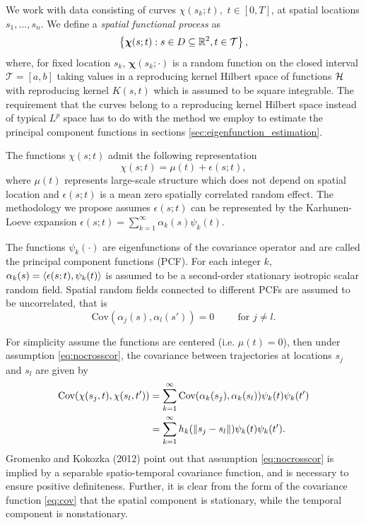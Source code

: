 We work with data consisting of curves $\chi(s_k; t),$ $t \in [0,T]$, at spatial locations $s_1, \dots, s_n$. We define a \emph{spatial functional process} as 
	\[
	 \left\{ \boldsymbol\chi(s; t): s \in D  \subseteq  \mathbb{R} ^2, t \in \mathcal{T} \right\},
	 \] 
where, for fixed location $s_k$, $\boldsymbol\chi(s_k; \cdot)$ is a random function on the closed interval $\mathcal{T} = [a,b]$ taking values in a reproducing kernel Hilbert space of functions $\mathcal{H}$ with reproducing kernel $K(s,t)$ which is assumed to be square integrable. The requirement that the curves belong to a reproducing kernel Hilbert space instead of typical $L^p$ space has to do with the method we employ to estimate the principal component functions in sections \ref{sec:eigenfunction_estimation}.
	
The functions $\chi(s;t)$ admit the following representation 
\begin{equation}
 	\chi(s;t) = \mu(t) + \epsilon(s;t),
\end{equation}
where $\mu(t)$ represents large-scale structure which does not depend on spatial location and $\epsilon(s;t)$ is a mean zero spatially correlated random effect. The methodology we propose assumes $\epsilon(s;t)$ can be represented by the Karhunen-Loeve expansion $\epsilon(s;t) = \sum_{k=1}^{\infty} \alpha_k(s)\psi_k(t)$.

The functions $\psi_k(\cdot)$ are eigenfunctions of the covariance operator and are called the principal component functions (PCF). For each integer $k$, $\alpha_k(s) = \langle \epsilon(s;t),  \psi_k(t) \rangle$ is assumed to be a second-order stationary isotropic scalar random field. Spatial random fields connected to different PCFs are assumed to be uncorrelated, that is 
\begin{equation}
	\text{Cov}(\alpha_j(s), \alpha_l(s')) = 0 \hspace{1cm} \text{for } j \neq l.
	\label{eq:nocrosscor}
\end{equation} 

For simplicity assume the functions are centered (i.e. $\mu(t)=0$), then under assumption  \eqref{eq:nocrosscor}, the covariance between trajectories at locations $s_j$ and $s_l$ are given by 
\begin{align}
	\text{Cov}(\chi(s_j,t), \chi(s_l, t')) &= \sum_{k=1}^{\infty}\text{Cov}(\alpha_k(s_j), \alpha_k(s_l))\psi_k(t)\psi_k(t')\\
	&= \sum_{k=1}^{\infty}h_k(\left\|s_j-s_l\right\|)\psi_k(t)\psi_k(t'). 
	\label{eq:cov}
\end{align}
Gromenko and Kokozka (2012) point out that assumption \eqref{eq:nocrosscor} is implied by a separable spatio-temporal covariance function, and is necessary to ensure positive definiteness. Further, it is clear from the form of the covariance function \eqref{eq:cov} that the spatial component is stationary, while the temporal component is nonstationary.

